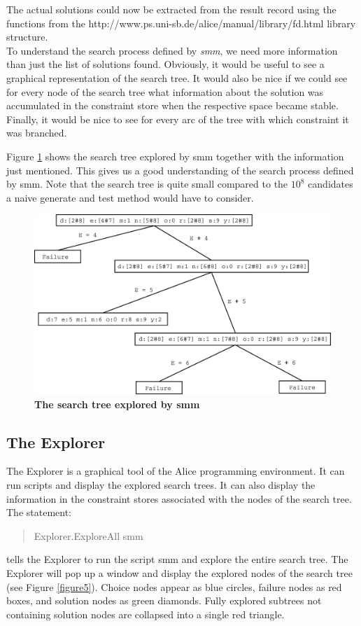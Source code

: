 \documentclass[a4paper]{scrartcl}
\begin{document}
The actual solutions could now be extracted from the result 
record using the functions from the
\htmladdnormallink{\textcolor{blue}{FD.Reflect}}
{http://www.ps.uni-sb.de/alice/manual/library/fd.html}
library structure.\\

To understand the search process defined by {\it smm}, we need more 
information than just the list of solutions found. Obviously, it would 
be useful to see a graphical representation of the search tree. It
would also be nice if we could see for every node of the search tree 
what information about the solution was accumulated in the constraint 
store when the respective space became stable. Finally, it would be
nice to see for every arc of the tree with which constraint it was 
branched.
\par
Figure \ref{figure4} shows the search tree explored by smm together 
with the information just mentioned. This gives us a good
understanding of the search process defined by smm. Note that the 
search tree is quite small compared to the $ 10^8 $ candidates a naive 
generate and test method would have to consider.


\begin{figure}[htpb]
\centerline{\includegraphics*[scale=0.3]{figs/fig5.eps}}
\caption{{\bf The search tree explored by smm}}
\label{figure4}
\end{figure}

\subsection{The Explorer}
The Explorer is a graphical tool of the Alice programming
environment. It can run scripts and display the explored search
trees. It can also display the information in the constraint stores 
associated with the nodes of the search tree.\\
The statement:\\
\begin{quote}
Explorer.ExploreAll smm\\
\end{quote}
tells the Explorer to run the script smm and explore the entire search 
tree. The Explorer will pop up a window and display the explored nodes 
of the search tree (see Figure \ref{figure5}). Choice nodes appear 
as blue circles, failure nodes as red boxes, and solution nodes as
green diamonds. Fully explored subtrees not containing solution nodes 
are collapsed into a single red triangle. 
\end{document}
